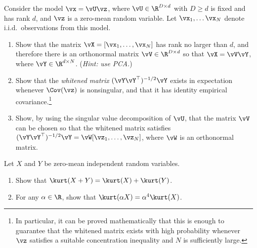 \documentclass[../../book-main.tex]{subfiles}
\begin{document}
\begin{exercise}\label{exercise:whitening}
    Consider the model $\vx = \vU \vz$, where $\vU \in \R^{D \times d}$ with $D \geq d$ is fixed and has rank $d$, and $\vz$ is a zero-mean random variable. Let $\vx_1, \dots \vx_N$ denote i.i.d.\ observations from this model.
    \begin{enumerate}
        \item Show that the matrix $\vX = [\vx_1, \dots, \vx_N]$ has rank no larger than $d$, and therefore there is an orthonormal matrix $\vV \in \R^{D \times d}$ so that $\vX = \vV \vY$, where $\vY \in \R^{d \times N}$. (\textit{Hint: use PCA.})
        \item Show that the \textit{whitened matrix} $(\vY \vY^\top)^{-1/2}\vY$ exists in expectation whenever $\Cov(\vz)$ is nonsingular, and that it has identity empirical covariance.\footnote{In particular, it can be proved mathematically that this is enough to guarantee that the whitened matrix exists with high probability whenever $\vz$ satisfies a suitable concentration inequality and $N$ is sufficiently large.}
        \item Show, by using the singular value decomposition of $\vU$, that the matrix $\vV$ can be chosen so that the whitened matrix satisfies $(\vY \vY^\top)^{-1/2} \vY = \vW [\vz_1, \dots, \vz_N]$, where $\vW$ is an orthonormal matrix.
    \end{enumerate}
\end{exercise}

\begin{exercise}\label{exercise:kurtosis-linearity-properties}
    Let $X$ and $Y$ be zero-mean independent random variables.
    \begin{enumerate}
        \item Show that $\kurt(X + Y) = \kurt(X) + \kurt(Y)$.
        \item For any $\alpha \in \R$, show that $\kurt(\alpha X) = \alpha^4 \kurt(X)$.
    \end{enumerate}
\end{exercise}
\end{document}

